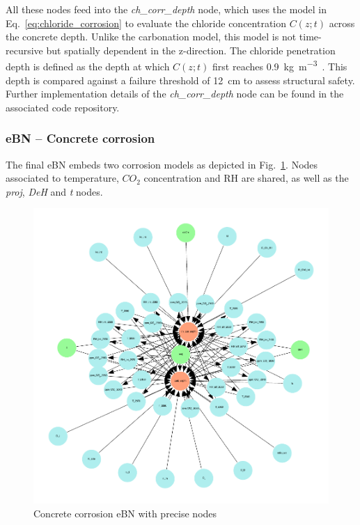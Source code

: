 All these nodes feed into the \textit{ch\_corr\_depth} node, which uses the model in Eq.~\ref{eq:chloride_corrosion} to evaluate the chloride concentration $C(z;t)$ across the concrete depth. 
Unlike the carbonation model, this model is not time-recursive but spatially dependent in the z-direction. The chloride penetration depth is defined as the depth at which $C(z;t)$ first reaches \SI{0.9}{\kilogram\per\cubic\meter}~\cite{fuma}.
This depth is compared against a failure threshold of \SI{12}{\centi\meter} to assess structural safety.
Further implementation details of the \textit{ch\_corr\_depth} node can be found in the associated code repository.

\subsubsection{eBN -- Concrete corrosion}
The final eBN embeds two corrosion models as depicted in Fig.~\ref{fig:precise_ebn}. Nodes associated to temperature, $CO_2$ concentration and RH are shared, as well as the \textit{proj}, \textit{DeH} and \textit{t} nodes. 

\begin{figure}[]
    \centering
    \includegraphics[width=\linewidth]{imgs/pdfs/12_total_ebn_precise.pdf}
    \caption{Concrete corrosion eBN with precise nodes}\label{fig:precise_ebn}
\end{figure}


